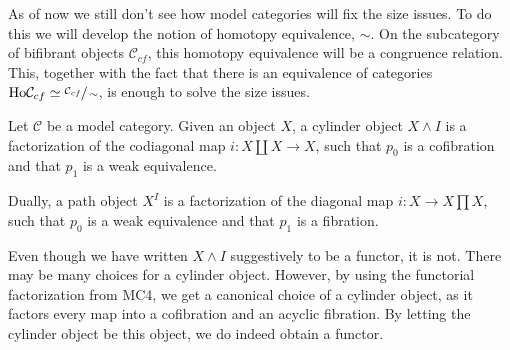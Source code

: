 \documentclass[../thesis.tex]{subfiles}
\begin{document}
            As of now we still don't see how model categories will fix the size issues. To do this we will develop the notion of homotopy equivalence, $\sim$. On the subcategory of bifibrant objects $\mathcal{C}_{cf}$, this homotopy equivalence will be a congruence relation. This, together with the fact that there is an equivalence of categories $\text{Ho}\mathcal{C}_{cf}\simeq \sfrac{\mathcal{C}_{cf}}{\sim}$, is enough to solve the size issues.

            \begin{definition}
                Let $\mathcal{C}$ be a model category. Given an object $X$, a cylinder object $X\wedge I$ is a factorization of the codiagonal map $i:X\coprod X \rightarrow X$, such that $p_0$ is a cofibration and that $p_1$ is a weak equivalence. 
                
                \begin{center}
                \end{center}

                Dually, a path object  $X^{I}$ is a factorization of the diagonal map $i: X \rightarrow X\prod X$, such that $p_0$ is a weak equivalence and that $p_1$ is a fibration.
                
                \begin{center}
                \end{center}
            \end{definition}

            \begin{remark}
                Even though we have written $X\wedge I$ suggestively to be a functor, it is not. There may be many choices for a cylinder object. However, by using the functorial factorization from MC4, we get a canonical choice of a cylinder object, as it factors every map into a cofibration and an acyclic fibration. By letting the cylinder object be this object, we do indeed obtain a functor.
            \end{remark}
\end{document}
